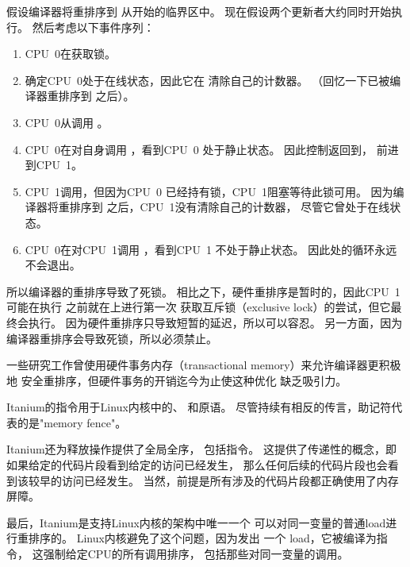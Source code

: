 {\begin{fcvref}
	假设编译器将重排序到
	从开始的临界区中。
	现在假设两个更新者大约同时开始执行。
	然后考虑以下事件序列：
	\begin{enumerate}
	\item	CPU~0在获取锁。
	\item	{}确定CPU~0处于在线状态，因此它在
		清除自己的计数器。
		（回忆一下已被编译器重排序到
		之后）。
	\item	CPU~0从调用
		。
	\item	CPU~0在对自身调用
		，看到CPU~0
		处于静止状态。
		因此控制返回到，
		前进到CPU~1。
	\item	CPU~1调用，但因为CPU~0
		已经持有锁，CPU~1阻塞等待此锁可用。
		因为编译器将重排序到
		之后，CPU~1没有清除自己的计数器，
		尽管它曾处于在线状态。
	\item	CPU~0在对CPU~1调用
		，看到CPU~1
		不处于静止状态。
		因此处的循环永远不会退出。
	\end{enumerate}

	所以编译器的重排序导致了死锁。
	相比之下，硬件重排序是暂时的，因此CPU~1可能在执行
	之前就在上进行第一次
	获取互斥锁（exclusive lock）的尝试，但它最终会执行。
	因为硬件重排序只导致短暂的延迟，所以可以容忍。
	另一方面，因为编译器重排序会导致死锁，所以必须禁止。

	一些研究工作曾使用硬件事务内存（transactional memory）来允许编译器更积极地
	安全重排序，但硬件事务的开销迄今为止使这种优化
	缺乏吸引力。
\end{fcvref}
}\QuickQuizEnd

Itanium的指令用于Linux内核中的、
和原语。
尽管持续有相反的传言，助记符代表的是"memory fence"。

Itanium还为释放操作提供了全局全序，
包括指令。
这提供了传递性的概念，即如果给定的代码片段看到给定的访问已经发生，
那么任何后续的代码片段也会看到该较早的访问已经发生。
当然，前提是所有涉及的代码片段都正确使用了内存屏障。

最后，Itanium是支持Linux内核的架构中唯一一个
可以对同一变量的普通load进行重排序的。
Linux内核避免了这个问题，因为发出
一个 load，它被编译为指令，
这强制给定CPU的所有调用排序，
包括那些对同一变量的调用。

